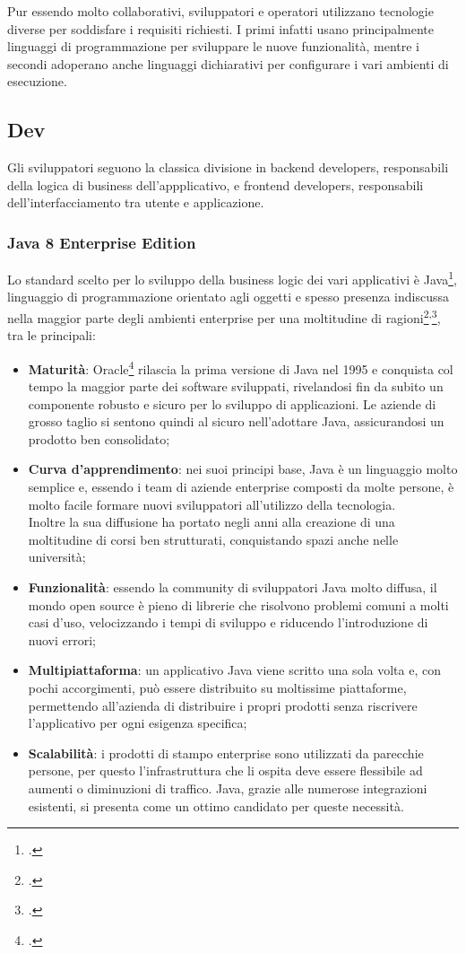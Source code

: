 Pur essendo molto collaborativi, sviluppatori e operatori utilizzano tecnologie diverse per soddisfare i requisiti richiesti. I primi infatti usano principalmente linguaggi di programmazione per sviluppare le nuove funzionalità, mentre i secondi adoperano anche linguaggi dichiarativi per configurare i vari ambienti di esecuzione.
\subsection{Dev}
Gli sviluppatori seguono la classica divisione in backend developers, responsabili della logica di business dell'appplicativo, e frontend developers, responsabili dell'interfacciamento tra utente e applicazione.
\subsubsection{Java 8 Enterprise Edition}
Lo standard scelto per lo sviluppo della business logic dei vari applicativi è Java\footcite{site:java}, linguaggio di programmazione orientato agli oggetti e spesso presenza indiscussa nella maggior parte degli ambienti enterprise per una moltitudine di ragioni\footcite{article:sojava}\textsuperscript{,}\footcite{article:mediumjava}, tra le principali:
\begin{itemize}
	\item \textbf{Maturità}: Oracle\footcite{site:oracle} rilascia la prima versione di Java nel 1995 e conquista col tempo la maggior parte dei software sviluppati, rivelandosi fin da subito un componente robusto e sicuro per lo sviluppo di applicazioni. Le aziende di grosso taglio si sentono quindi al sicuro nell'adottare Java, assicurandosi un prodotto ben consolidato;
	\item \textbf{Curva d'apprendimento}: nei suoi principi base, Java è un linguaggio molto semplice e, essendo i team di aziende enterprise composti da molte persone, è molto facile formare nuovi sviluppatori all'utilizzo della tecnologia.\\
	Inoltre la sua diffusione ha portato negli anni alla creazione di una moltitudine di corsi ben strutturati, conquistando spazi anche nelle università;
	\item \textbf{Funzionalità}: essendo la community di sviluppatori Java molto diffusa, il mondo open source è pieno di librerie che risolvono problemi comuni a molti casi d'uso, velocizzando i tempi di sviluppo e riducendo l'introduzione di nuovi errori;
	\item \textbf{Multipiattaforma}: un applicativo Java viene scritto una sola volta e, con pochi accorgimenti, può essere distribuito su moltissime piattaforme, permettendo all'azienda di distribuire i propri prodotti senza riscrivere l'applicativo per ogni esigenza specifica;
	\item \textbf{Scalabilità}: i prodotti di stampo enterprise sono utilizzati da parecchie persone, per questo l'infrastruttura che li ospita deve essere flessibile ad aumenti o diminuzioni di traffico. Java, grazie alle numerose integrazioni esistenti, si presenta come un ottimo candidato per queste necessità.
\end{itemize}
